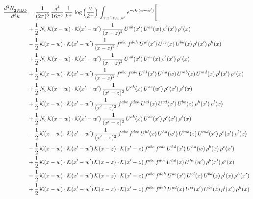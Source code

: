 \documentclass[9pt]{article}
\numberwithin{equation}{section}
\begin{document}
\begin{align}
 \frac{d^{3}N_{2\,\rm NLO}^{\rm}}{d^{3}k}  & = \frac{1}{(2\pi)^{3}}\,\frac{g^{4}}{16\pi^{5}}\,\frac{1}{k^{+}}\,\log{\left(\frac{\vee}{k^{+}}\right)}\, \int_{x,x',z,w,w'}e^{-ik\cdot (w-w')}\Bigg[\notag\\ & 
+\frac{1}{2}\,N_{c}\,\mathcal{K}(x-w)\cdot\mathcal{K}(x'-w')\,\frac{1}{(x-z)^{2}}\,U^{ab}(x')\,U^{ac}(w)\,\rho^{b}(x')\,\rho^{c}(x)\notag \\ 
&-\frac{1}{2}\,\mathcal{K}(x-w)\cdot\mathcal{K}(x'-w')\,\frac{1}{(x-z)^{2}}\,f^{abc}\,f^{deh}\,U^{al}(x')\,U^{ce}(x)\,U^{bd}(z)\,\rho^{l}(x')\,\rho^{h}(x)\notag \\ 
&+\frac{1}{2}\,N_{c}\,\mathcal{K}(x-w)\cdot\mathcal{K}(x'-w')\,\frac{1}{(x-z)^{2}}\,U^{ab}(x')\,U^{ac}(x)\,\rho^{b}(x')\,\rho^{c}(x)\notag \\ 
&+\frac{1}{2}\,\mathcal{K}(x-w)\cdot\mathcal{K}(x'-w')\,\frac{1}{(x-z)^{2}}\,f^{abc}\,f^{cde}\,U^{hl}(x')\,U^{ha}(w)\,U^{mb}(z)\,U^{md}(x)\,\rho^{l}(x')\,\rho^{e}(x)\notag \\ 
&+\frac{1}{2}\,N_{c}\,\mathcal{K}(x-w)\cdot\mathcal{K}(x'-w')\,\frac{1}{(x'-z)^{2}}\,U^{ab}(x)\,U^{ac}(w')\,\rho^{c}(x')\,\rho^{b}(x)\notag \\ 
&+\frac{1}{2}\,\mathcal{K}(x-w)\cdot\mathcal{K}(x'-w')\,\frac{1}{(x'-z)^{2}}\,f^{abc}\,f^{deh}\,U^{al}(x)\,U^{cd}(x')\,U^{be}(z)\,\rho^{h}(x')\,\rho^{l}(x)\notag \\ 
&+\frac{1}{2}\,N_{c}\,\mathcal{K}(x-w)\cdot\mathcal{K}(x'-w')\,\frac{1}{(x'-z)^{2}}\,U^{ab}(x)\,U^{ac}(x')\,\rho^{c}(x')\,\rho^{b}(x)\notag \\ 
&-\frac{1}{2}\,\mathcal{K}(x-w)\cdot\mathcal{K}(x'-w')\,\frac{1}{(x'-z)^{2}}\,f^{abc}\,f^{dce}\,U^{hl}(x)\,U^{ha}(w')\,U^{mb}(z)\,U^{md}(x')\,\rho^{e}(x')\,\rho^{l}(x)\notag \\ 
&-\frac{1}{2}\,\mathcal{K}(x-w)\cdot\mathcal{K}(x'-w')\,\mathcal{K}(x-z)\cdot\mathcal{K}(x'-z)\,f^{abc}\,f^{cde}\,U^{hd}(x')\,U^{ha}(w)\,\rho^{b}(x)\,\rho^{e}(x')\notag \\ 
&+\frac{1}{2}\,\mathcal{K}(x-w)\cdot\mathcal{K}(x'-w')\,\mathcal{K}(x-z)\cdot\mathcal{K}(x'-z)\,f^{abc}\,f^{dce}\,U^{hd}(x)\,U^{ha}(w')\,\rho^{b}(x')\,\rho^{e}(x)\notag \\ 
&-\frac{1}{2}\,\mathcal{K}(x-w)\cdot\mathcal{K}(x'-w')\,\mathcal{K}(x-z)\cdot\mathcal{K}(x'-z)\,f^{abc}\,f^{deh}\,U^{ae}(x')\,U^{cl}(x)\,U^{bd}(z)\,\rho^{l}(x)\,\rho^{h}(x')\notag \\ 
&+\frac{1}{2}\,\mathcal{K}(x-w)\cdot\mathcal{K}(x'-w')\,\mathcal{K}(x-z)\cdot\mathcal{K}(x'-z)\,f^{abc}\,f^{deh}\,U^{ad}(x)\,U^{cl}(x')\,U^{be}(z)\,\rho^{l}(x')\,\rho^{h}(x)\notag \\ 

\end{align}
\end{document}
